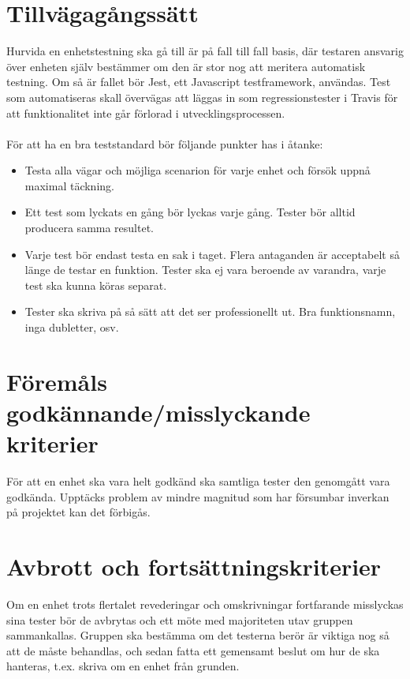 \section{Tillvägagångssätt}
	Hurvida en enhetstestning ska gå till är på fall till fall basis, där testaren ansvarig över enheten själv bestämmer om den är stor nog att meritera automatisk testning.
	Om så är fallet bör Jest, ett Javascript testframework, användas. Test som automatiseras skall övervägas att läggas in som regressionstester i Travis för att funktionalitet inte går förlorad i utvecklingsprocessen. \\
	\\
	För att ha en bra teststandard bör följande punkter has i åtanke:
	\begin {itemize}[leftmargin=2cm]
	 \item [Genomgående] Testa alla vägar och möjliga scenarion för varje enhet och försök uppnå maximal täckning.
	 \item [Repeterbar] Ett test som lyckats en gång bör lyckas varje gång. Tester bör alltid producera samma resultet.
	 \item [Oberoende] Varje test bör endast testa en sak i taget. Flera antaganden är acceptabelt så länge de testar en funktion. Tester ska ej vara beroende av varandra, varje test ska kunna köras separat.
	 \item [Kodstandard] Tester ska skriva på så sätt att det ser professionellt ut. Bra funktionsnamn, inga dubletter, osv.
	\end {itemize}



\section{Föremåls godkännande/misslyckande kriterier}
	För att en enhet ska vara helt godkänd ska samtliga tester den genomgått vara godkända. Upptäcks problem av mindre magnitud som har försumbar inverkan på projektet kan det förbigås.



\section{Avbrott och fortsättningskriterier}
	Om en enhet trots flertalet revederingar och omskrivningar fortfarande misslyckas sina tester bör de avbrytas och ett möte med majoriteten utav gruppen sammankallas.
	Gruppen ska bestämma om det testerna berör är viktiga nog så att de måste behandlas, och sedan fatta ett gemensamt beslut om hur de ska hanteras, t.ex. skriva om en enhet från grunden.


